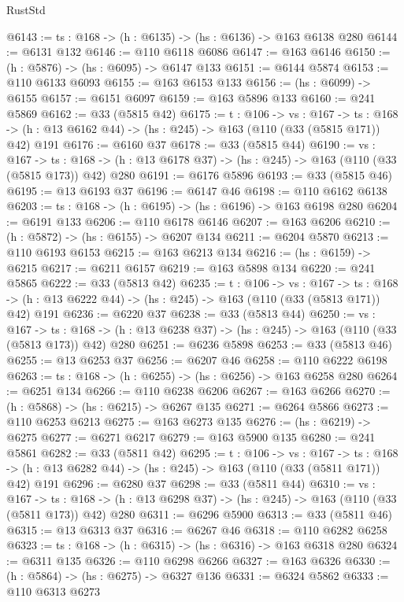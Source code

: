 \begin{lexlean}{RustStd}
\begin{coremodule}
@6143 := {ts : @168} -> (h : @6135) -> (hs : @6136) -> @163 @6138 @280
@6144 := @6131 @132
@6146 := @110 @6118 @6086
@6147 := @163 @6146
@6150 := (h : @5876) -> (hs : @6095) -> @6147 @133
@6151 := @6144 @5874
@6153 := @110 @6133 @6093
@6155 := @163 @6153 @133
@6156 := (hs : @6099) -> @6155
@6157 := @6151 @6097
@6159 := @163 @5896 @133
@6160 := @241 @5869
@6162 := @33 (@5815 @42)
@6175 := {t : @106} ->
  {vs : @167} ->
  {ts : @168} -> (h : @13 @6162 @44) -> (hs : @245) -> @163 (@110 (@33 (@5815 @171)) @42) @191
@6176 := @6160 @37
@6178 := @33 (@5815 @44)
@6190 := {vs : @167} ->
  {ts : @168} -> (h : @13 @6178 @37) -> (hs : @245) -> @163 (@110 (@33 (@5815 @173)) @42) @280
@6191 := @6176 @5896
@6193 := @33 (@5815 @46)
@6195 := @13 @6193 @37
@6196 := @6147 @46
@6198 := @110 @6162 @6138
@6203 := {ts : @168} -> (h : @6195) -> (hs : @6196) -> @163 @6198 @280
@6204 := @6191 @133
@6206 := @110 @6178 @6146
@6207 := @163 @6206
@6210 := (h : @5872) -> (hs : @6155) -> @6207 @134
@6211 := @6204 @5870
@6213 := @110 @6193 @6153
@6215 := @163 @6213 @134
@6216 := (hs : @6159) -> @6215
@6217 := @6211 @6157
@6219 := @163 @5898 @134
@6220 := @241 @5865
@6222 := @33 (@5813 @42)
@6235 := {t : @106} ->
  {vs : @167} ->
  {ts : @168} -> (h : @13 @6222 @44) -> (hs : @245) -> @163 (@110 (@33 (@5813 @171)) @42) @191
@6236 := @6220 @37
@6238 := @33 (@5813 @44)
@6250 := {vs : @167} ->
  {ts : @168} -> (h : @13 @6238 @37) -> (hs : @245) -> @163 (@110 (@33 (@5813 @173)) @42) @280
@6251 := @6236 @5898
@6253 := @33 (@5813 @46)
@6255 := @13 @6253 @37
@6256 := @6207 @46
@6258 := @110 @6222 @6198
@6263 := {ts : @168} -> (h : @6255) -> (hs : @6256) -> @163 @6258 @280
@6264 := @6251 @134
@6266 := @110 @6238 @6206
@6267 := @163 @6266
@6270 := (h : @5868) -> (hs : @6215) -> @6267 @135
@6271 := @6264 @5866
@6273 := @110 @6253 @6213
@6275 := @163 @6273 @135
@6276 := (hs : @6219) -> @6275
@6277 := @6271 @6217
@6279 := @163 @5900 @135
@6280 := @241 @5861
@6282 := @33 (@5811 @42)
@6295 := {t : @106} ->
  {vs : @167} ->
  {ts : @168} -> (h : @13 @6282 @44) -> (hs : @245) -> @163 (@110 (@33 (@5811 @171)) @42) @191
@6296 := @6280 @37
@6298 := @33 (@5811 @44)
@6310 := {vs : @167} ->
  {ts : @168} -> (h : @13 @6298 @37) -> (hs : @245) -> @163 (@110 (@33 (@5811 @173)) @42) @280
@6311 := @6296 @5900
@6313 := @33 (@5811 @46)
@6315 := @13 @6313 @37
@6316 := @6267 @46
@6318 := @110 @6282 @6258
@6323 := {ts : @168} -> (h : @6315) -> (hs : @6316) -> @163 @6318 @280
@6324 := @6311 @135
@6326 := @110 @6298 @6266
@6327 := @163 @6326
@6330 := (h : @5864) -> (hs : @6275) -> @6327 @136
@6331 := @6324 @5862
@6333 := @110 @6313 @6273

\end{coremodule}
\end{lexlean}
